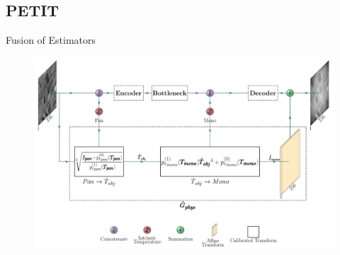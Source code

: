 \subsection{PETIT}
\begin{frame}{Fusion of Estimators}
  \begin{figure}
    \centering
    \includegraphics[width=0.65\linewidth]{../figs/network/src/petit.pdf}
  \end{figure}
\end{frame}
